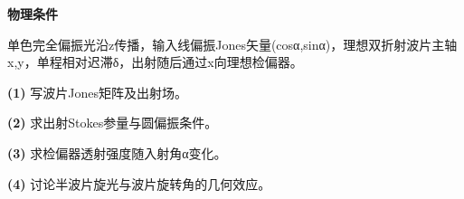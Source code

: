 \textbf{物理条件}\par 单色完全偏振光沿z传播，输入线偏振Jones矢量(cosα,sinα)，理想双折射波片主轴x,y，单程相对迟滞δ，出射随后通过x向理想检偏器。
\par\noindent\textbf{(1)} 写波片Jones矩阵及出射场。
\par\noindent\textbf{(2)} 求出射Stokes参量与圆偏振条件。
\par\noindent\textbf{(3)} 求检偏器透射强度随入射角α变化。
\par\noindent\textbf{(4)} 讨论半波片旋光与波片旋转角的几何效应。
